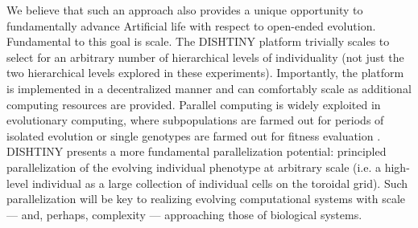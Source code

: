We believe that such an approach also provides a unique opportunity to fundamentally advance Artificial life with respect to open-ended evolution.
Fundamental to this goal is scale.
The DISHTINY platform trivially scales to select for an arbitrary number of hierarchical levels of individuality (not just the two hierarchical levels explored in these experiments).
Importantly, the platform is implemented in a decentralized manner and can comfortably scale as additional computing resources are provided.
Parallel computing is widely exploited in evolutionary computing, where subpopulations are farmed out for periods of isolated evolution or single genotypes are farmed out for fitness evaluation
\citep{lin1994coarse, real17a}.
DISHTINY presents a more fundamental parallelization potential: principled parallelization of the evolving individual phenotype at arbitrary scale (i.e. a high-level individual as a large collection of individual cells on the toroidal grid).
Such parallelization will be key to realizing evolving computational systems with scale --- and, perhaps, complexity --- approaching those of biological systems.
